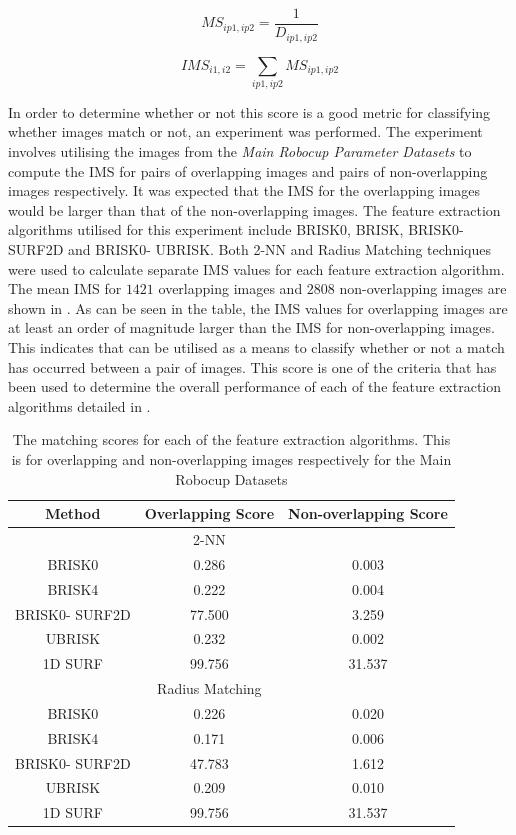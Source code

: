\documentclass[11pt]{report}
\begin{document}
\begin{equation}
MS_{ip1, ip2} = \frac{1}{D_{ip1, ip2}}
\label{eqn:inverseDistance}
\end{equation}

\begin{equation}
IMS_{i1, i2} = \sum_{ip1, ip2} MS_{ip1, ip2}
\label{eqn:ims}
\end{equation}

In order to determine whether or not this score is a good metric for classifying whether images match or not, an experiment was performed. The experiment involves utilising the images from the \textit{Main Robocup Parameter Datasets} to compute the IMS for pairs of overlapping images and pairs of non-overlapping images respectively. It was expected that the IMS for the overlapping images would be larger than that of the non-overlapping images. The feature extraction algorithms utilised for this experiment include BRISK0, BRISK, BRISK0-SURF2D and BRISK0- UBRISK. Both 2-NN and Radius Matching techniques were used to calculate separate IMS values for each feature extraction algorithm.\\

The mean IMS for $1421$ overlapping images and $2808$ non-overlapping images are shown in . As can be seen in the table, the IMS values for overlapping images are at least an order of magnitude larger than the IMS for non-overlapping images. This indicates that  can be utilised as a means to classify whether or not a match has occurred between a pair of images. This score is one of the criteria that has been used to determine the overall performance of each of the feature extraction algorithms detailed in .\\

\begin{table}
\caption{The matching scores for each of the feature extraction algorithms. This is for overlapping and non-overlapping images respectively for the Main Robocup Datasets}
\begin{tabular}{|c|c|c|}
\hline 
Method & Overlapping Score & Non-overlapping Score\tabularnewline
\hline 
\hline 
 & 2-NN & \tabularnewline
\hline 
BRISK0 & 0.286 & 0.003\tabularnewline
\hline 
BRISK4 & 0.222 & 0.004\tabularnewline
\hline 
BRISK0- SURF2D & 77.500 & 3.259\tabularnewline
\hline 
UBRISK & 0.232 & 0.002\tabularnewline
\hline 
1D SURF & 99.756 & 31.537\tabularnewline
\hline 
 & Radius Matching & \tabularnewline
\hline 
BRISK0 & 0.226 & 0.020\tabularnewline
\hline 
BRISK4 & 0.171 & 0.006\tabularnewline
\hline 
BRISK0- SURF2D & 47.783 & 1.612\tabularnewline
\hline 
UBRISK & 0.209 & 0.010\tabularnewline
\hline 
1D SURF & 99.756 & 31.537\tabularnewline
\hline 
\end{tabular}
\label{tab:matchingScoreCompare}
\end{table}
\end{document}
